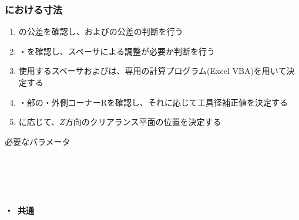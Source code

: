\subsubsection{\EndFacecutMilling における寸法}
\begin{enumerate}[label=\sarrow]
\item {}\nameWorkTotalLength の公差を確認し、\TopAlocationLength および\BottomAlocationLength の公差の判断を行う
\item \TopAlocationLength・\BottomAlocationLength を確認し、スペーサによる調整が必要か判断を行う
\item 使用するスペーサおよび\ReAlocationLength は、専用の計算プログラム(Excel VBA)を用いて決定する
\item \OuterDiameter・\nameEndFace 部の\nameThickness・\nameEndFace 外側コーナーRを確認し、それに応じて工具径補正値を決定する
\item \ReAlocationLength に応じて、$Z$方向のクリアランス平面の位置を決定する
\end{enumerate}
\begin{Parameter}{必要なパラメータ}
\paragraph*{\ReAlocationLength}
\PMWorkTotalLength
\PMTopAlocationLength
\PMBottomAlocationLength
\PMACOD
\PMJigLength
{}
\tcbline*
\paragraph*{\TopEndFacecut}
\PMTopReAlocationLength
\PMACOD
\PMBDOD
\PMODCornerR\\
\PMTopEndACID
\PMTopEndBDID
{}
\tcbline*
\paragraph*{\BottomEndFacecut}
\PMBottomReAlocationLength
\PMACOD
\PMBDOD
\PMODCornerR\\
\PMBottomEndACID
\PMBottomEndBDID
{}
\tcbline*
\paragraph*{\TopEndFacecut・\BottomEndFacecut~共通}
\end{Parameter}

